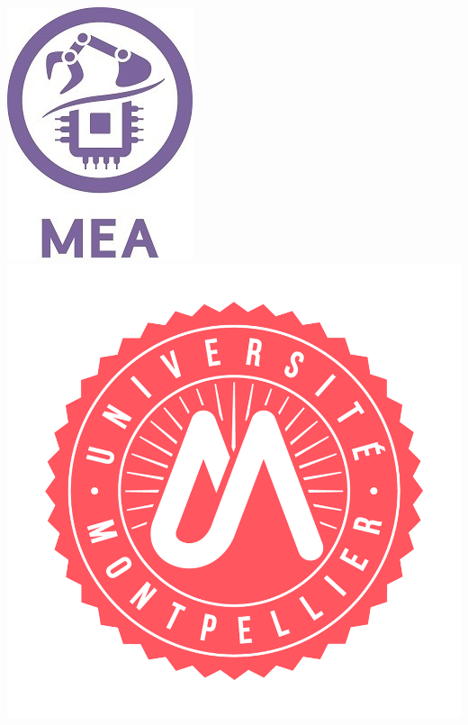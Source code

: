 \begin{titlepage}
    \vspace{2.6cm}
        \includegraphics[height=0.15\textheight]{mea.jpg}
        \hfill
        \includegraphics[height=0.15\textheight]{um.png}
  \end{titlepage}
\makeatother